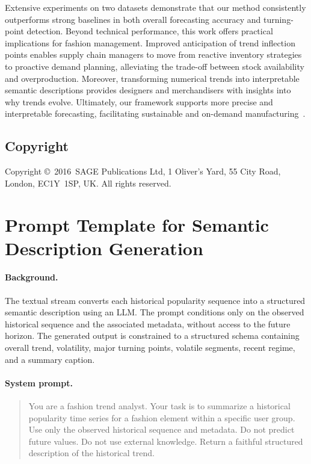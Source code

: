 \documentclass[Afour,sageh,times]{sagej}
\def\volumeyear{2016}
\begin{document}
{Extensive experiments on two datasets demonstrate that our method consistently outperforms strong baselines in both overall forecasting accuracy and turning-point detection. Beyond technical performance, this work offers practical implications for fashion management. Improved anticipation of trend inflection points enables supply chain managers to move from reactive inventory strategies to proactive demand planning, alleviating the trade-off between stock availability and overproduction. Moreover, transforming numerical trends into interpretable semantic descriptions provides designers and merchandisers with insights into why trends evolve. Ultimately, our framework supports more precise and interpretable forecasting, facilitating sustainable and on-demand manufacturing~\cite{abrishami2024textile}.

\newpage
\subsection{Copyright}
Copyright \copyright\ \volumeyear\ SAGE Publications Ltd,
1 Oliver's Yard, 55 City Road, London, EC1Y~1SP, UK. All
rights reserved.

\begin{acks}

\end{acks}




\appendix
\section{Prompt Template for Semantic Description Generation}

\paragraph{Background.}
The textual stream converts each historical popularity sequence into a structured semantic description using an LLM. The prompt conditions only on the observed historical sequence and the associated metadata, without access to the future horizon. The generated output is constrained to a structured schema containing overall trend, volatility, major turning points, volatile segments, recent regime, and a summary caption.

\paragraph{System prompt.}
\begin{quote}
\small
You are a fashion trend analyst. Your task is to summarize a historical popularity time series for a fashion element within a specific user group. Use only the observed historical sequence and metadata. Do not predict future values. Do not use external knowledge. Return a faithful structured description of the historical trend.
\end{quote}

}
\end{document}
